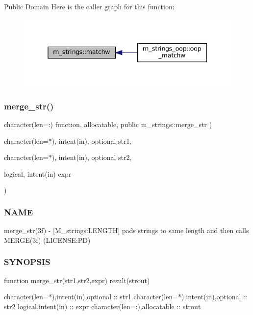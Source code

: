 Public Domain Here is the caller graph for this function\+:\nopagebreak
\begin{figure}[H]
\begin{center}
\leavevmode
\includegraphics[width=338pt]{namespacem__strings_a5f96f66162f0f04d58b4f5dced8e82c6_icgraph}
\end{center}
\end{figure}
\mbox{\label{namespacem__strings_aba5a8d7fc092b38d1939f37a13247c1e}} 
\subsubsection{\texorpdfstring{merge\+\_\+str()}{merge\_str()}}
{\footnotesize\ttfamily character(len=\+:) function, allocatable, public m\+\_\+strings\+::merge\+\_\+str (\begin{DoxyParamCaption}\item[{character(len=$\ast$), intent(in), optional}]{str1,  }\item[{character(len=$\ast$), intent(in), optional}]{str2,  }\item[{logical, intent(in)}]{expr }\end{DoxyParamCaption})}



\subsubsection*{N\+A\+ME}

merge\+\_\+str(3f) -\/ \mbox{[}M\+\_\+strings\+:L\+E\+N\+G\+TH\mbox{]} pads strings to same length and then calls M\+E\+R\+G\+E(3f) (L\+I\+C\+E\+N\+SE\+:PD) 

\subsubsection*{S\+Y\+N\+O\+P\+S\+IS}

\begin{DoxyVerb}function merge_str(str1,str2,expr) result(strout)

 character(len=*),intent(in),optional :: str1
 character(len=*),intent(in),optional :: str2
 logical,intent(in)              :: expr
 character(len=:),allocatable    :: strout
\end{DoxyVerb}

